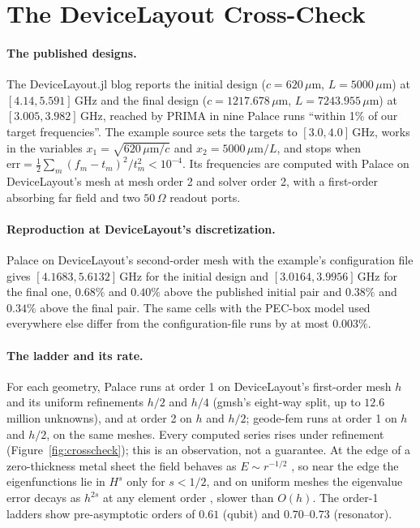 \documentclass{anvil-paper}
\begin{document}
\section{The DeviceLayout Cross-Check}
\label{sec:crosscheck}

\paragraph{The published designs.}
The DeviceLayout.jl blog \citep{devicelayout-blog} reports the initial
design ($c = 620\,\mu$m, $L = 5000\,\mu$m) at $[4.14, 5.591]$\,GHz and
the final design ($c = 1217.678\,\mu$m, $L = 7243.955\,\mu$m) at
$[3.005, 3.982]$\,GHz, reached by PRIMA in nine Palace runs ``within 1\% of
our target frequencies''. The example source \citep{devicelayout-example}
sets the targets to $[3.0, 4.0]$\,GHz, works in the variables $x_1 =
\sqrt{620\,\mu\mathrm{m}/c}$ and $x_2 = 5000\,\mu\mathrm{m}/L$, and stops
when $\mathrm{err} = \frac12\sum_m (f_m - t_m)^2/t_m^2 < 10^{-4}$. Its
frequencies are computed with Palace on DeviceLayout's mesh at mesh order 2
and solver order 2, with a first-order absorbing far field and two
$50\,\Omega$ readout ports.

\paragraph{Reproduction at DeviceLayout's discretization.}
Palace on DeviceLayout's second-order mesh with the example's
configuration file gives $[4.1683, 5.6132]$\,GHz for the initial design
and $[3.0164, 3.9956]$\,GHz for the final one, $0.68\%$ and $0.40\%$
above the published initial pair and $0.38\%$ and $0.34\%$ above the
final pair. The same cells with the PEC-box model used everywhere else
differ from the configuration-file runs by at most $0.003\%$.

\paragraph{The ladder and its rate.}
For each geometry, Palace runs at order 1 on DeviceLayout's first-order
mesh $h$ and its uniform refinements $h/2$ and $h/4$ (gmsh's eight-way
split, up to $12.6$ million unknowns), and at order 2 on $h$ and $h/2$;
geode-fem runs at order 1 on $h$ and $h/2$, on the same meshes. Every
computed series rises under refinement (Figure~\ref{fig:crosscheck}); this
is an observation, not a guarantee. At the edge of a zero-thickness metal
sheet the field behaves as $E \sim r^{-1/2}$ \citep{meixner1972behavior},
so near the edge the eigenfunctions lie in $H^{s}$ only for $s < 1/2$, and
on uniform meshes the eigenvalue error decays as $h^{2s}$ at any element
order \citep{boffi2010finite}, slower than $O(h)$. The order-1
ladders show pre-asymptotic orders of $0.61$ (qubit) and $0.70$--$0.73$
(resonator).
\end{document}
